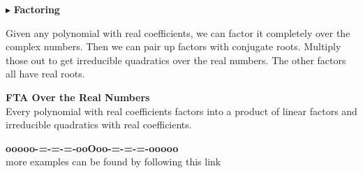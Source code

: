 \documentclass{ximera}
\begin{document}
$\blacktriangleright$  \textbf{Factoring}




Given any polynomial with real coefficients, we can factor it completely over the complex numbers.  Then we can pair up factors with conjugate roots. Multiply those out to get irreducible quadratics over the real numbers.  The other factors all have real roots.





\begin{theorem}  \textbf{\textcolor{blue!55!black}{FTA Over the Real Numbers}} \\

Every polynomial with real coefficients factors into a product of linear factors and irreducible quadratics with real coefficients.



\end{theorem}




































































\begin{center}
\textbf{\textcolor{green!50!black}{ooooo-=-=-=-ooOoo-=-=-=-ooooo}} \\

more examples can be found by following this link\\ 

\end{center}
\end{document}
